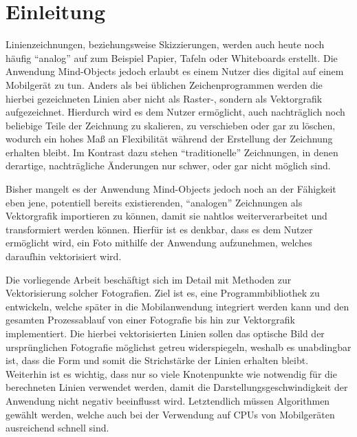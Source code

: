 \chapter{Einleitung}

Linienzeichnungen, beziehungsweise Skizzierungen, werden auch heute noch häufig \enquote{analog} auf zum Beispiel Papier, Tafeln oder Whiteboards erstellt.
Die Anwendung Mind-Objects jedoch erlaubt es einem Nutzer dies digital auf einem Mobilgerät zu tun.
Anders als bei üblichen Zeichenprogrammen werden die hierbei gezeichneten Linien aber nicht als Raster-, sondern als Vektorgrafik aufgezeichnet.
Hierdurch wird es dem Nutzer ermöglicht, auch nachträglich noch beliebige Teile der Zeichnung zu skalieren, zu verschieben oder gar zu löschen, wodurch ein hohes Maß an Flexibilität während der Erstellung der Zeichnung erhalten bleibt.
Im Kontrast dazu stehen \enquote{traditionelle} Zeichnungen, in denen derartige, nachträgliche Änderungen nur schwer, oder gar nicht möglich sind.

Bisher mangelt es der Anwendung Mind-Objects jedoch noch an der Fähigkeit eben jene, potentiell bereits existierenden, \enquote{analogen} Zeichnungen als Vektorgrafik importieren zu können, damit sie nahtlos weiterverarbeitet und transformiert werden können.
Hierfür ist es denkbar, dass es dem Nutzer ermöglicht wird, ein Foto mithilfe der Anwendung aufzunehmen, welches daraufhin vektorisiert wird.

Die vorliegende Arbeit beschäftigt sich im Detail mit Methoden zur Vektorisierung solcher Fotografien.
Ziel ist es, eine Programmbibliothek zu entwickeln, welche später in die Mobilanwendung integriert werden kann und den gesamten Prozessablauf von einer Fotografie bis hin zur Vektorgrafik implementiert.
Die hierbei vektorisierten Linien sollen das optische Bild der ursprünglichen Fotografie möglichst getreu widerspiegeln, weshalb es unabdingbar ist, dass die Form und somit die Strichstärke der Linien erhalten bleibt.
Weiterhin ist es wichtig, dass nur so viele Knotenpunkte wie notwendig für die berechneten Linien verwendet werden, damit die Darstellungsgeschwindigkeit der Anwendung nicht negativ beeinflusst wird.
Letztendlich müssen Algorithmen gewählt werden, welche auch bei der Verwendung auf CPUs von Mobilgeräten ausreichend schnell sind.
